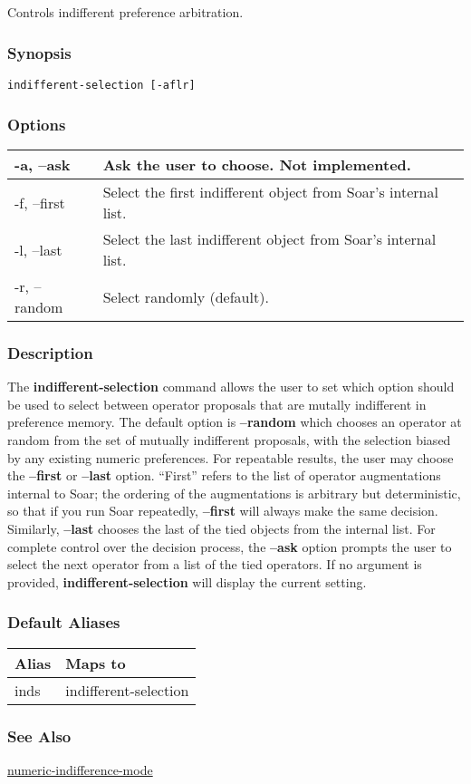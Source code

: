 \subsection{}
\label{indifferent-selection}
Controls indifferent preference arbitration. 
\subsubsection*{Synopsis}
\begin{verbatim}
indifferent-selection [-aflr]
\end{verbatim}
\subsubsection*{Options}
\begin{tabular}{|l|l|}
\hline 
 -a, --ask  & Ask the user to choose. Not implemented. \\
 \hline 
 -f, --first  & Select the first indifferent object from Soar's internal list.  \\
 \hline 
 -l, --last  & Select the last indifferent object from Soar's internal list.  \\
 \hline 
 -r, --random  & Select randomly (default).  \\
 \hline 
\end{tabular}
\subsubsection*{Description}
 The \textbf{indifferent-selection}
 command allows the user to set which option should be used to select between operator proposals that are mutally indifferent in preference memory. 
 The default option is \textbf{--random}
 which chooses an operator at random from the set of mutually indifferent proposals, with the selection biased by any existing numeric preferences. For repeatable results, the user may choose the \textbf{--first}
 or \textbf{--last}
 option. ``First'' refers to the list of operator augmentations internal to Soar; the ordering of the augmentations is arbitrary but deterministic, so that if you run Soar repeatedly, \textbf{--first}
 will always make the same decision. Similarly, \textbf{--last}
 chooses the last of the tied objects from the internal list. For complete control over the decision process, the \textbf{--ask}
 option prompts the user to select the next operator from a list of the tied operators. 
 If no argument is provided, \textbf{indifferent-selection}
 will display the current setting. 
\subsubsection*{Default Aliases}
\begin{tabular}{|l|l|}
\hline 
 Alias  & Maps to  \\
 \hline 
 inds  & indifferent-selection  \\
 \hline 
\end{tabular}
\subsubsection*{See Also}
\hyperref[numeric-indifference-mode]{numeric-indifference-mode} 
